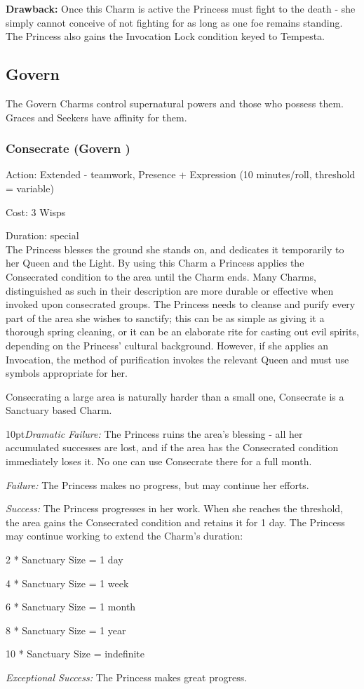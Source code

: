\textbf{Drawback:} Once this Charm is active the Princess must fight to the death - she simply cannot conceive of not fighting for as long as one foe remains standing. The Princess also gains the Invocation Lock condition keyed to Tempesta.

\subsection*{Govern}
The Govern Charms control supernatural powers and those who possess them. Graces and Seekers have affinity for them.

\subsubsection*{Consecrate (Govern \textbullet)}

\noindent Action: Extended - teamwork, Presence + Expression (10 minutes/roll, threshold = variable)

\noindent Cost: 3 Wisps

\noindent Duration: special\\

\noindent The Princess blesses the ground she stands on, and dedicates it temporarily to her Queen and the Light. By using this Charm a Princess applies the Consecrated condition to the area until the Charm ends. Many Charms, distinguished as such in their description are more durable or effective when invoked upon consecrated groups. The Princess needs to cleanse and purify every part of the area she wishes to sanctify; this can be as simple as giving it a thorough spring cleaning, or it can be an elaborate rite for casting out evil spirits, depending on the Princess' cultural background. However, if she applies an Invocation, the method of purification invokes the relevant Queen and must use symbols appropriate for her. 

Consecrating a large area is naturally harder than a small one, Consecrate is a Sanctuary based Charm. 

    \begin{myindentpar}{10pt}\emph{Dramatic Failure:} The Princess ruins the area's blessing - all her accumulated successes are lost, and if the area has the Consecrated  condition immediately loses it. No one can use Consecrate there for a full month.

    \emph{Failure:} The Princess makes no progress, but may continue her efforts.

    \emph{Success:} The Princess progresses in her work. When she reaches the threshold, the area gains the Consecrated condition and retains it for 1 day. The Princess may continue working to extend the Charm's duration:

    2 * Sanctuary Size = 1 day
    
    4 * Sanctuary Size = 1 week
    
    6 * Sanctuary Size = 1 month
    
    8 * Sanctuary Size = 1 year
    
    10 * Sanctuary Size = indefinite 

    \emph{Exceptional Success:} The Princess makes great progress.\end{myindentpar}

